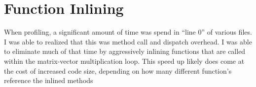 \documentclass{article}
\begin{document}
\section{Function Inlining}
When profiling, a significant amount of time was spend in ``line 0'' of various files.
I was able to realized that this was method call and dispatch overhead.
I was able to eliminate much of that time by aggressively inlining functions that are called within the matrix-vector multiplication loop.
This speed up likely does come at the cost of increased code size, depending on how many different function's reference the inlined methods
\end{document}
